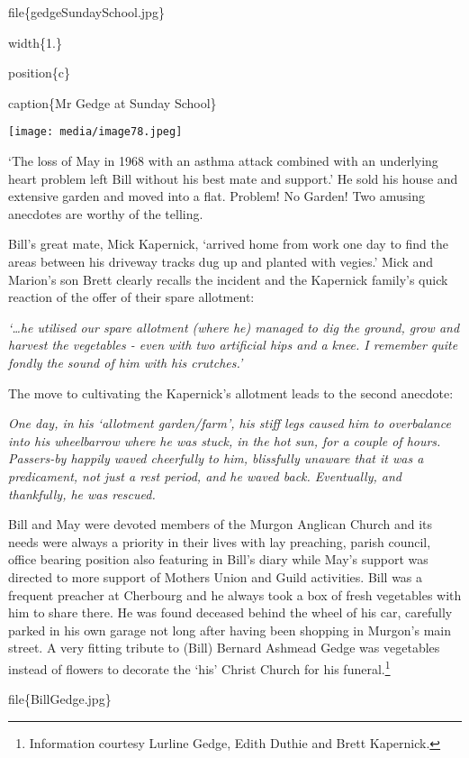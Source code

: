 file\{gedgeSundaySchool.jpg\}

width\{1.\}

position\{c\}

caption\{Mr Gedge at Sunday School\}

\texttt{[image: media/image78.jpeg]}

`The loss of May in 1968 with an asthma attack combined with an underlying heart problem left Bill without his best mate and support.' He sold his house and extensive garden and moved into a flat. Problem! No Garden! Two amusing anecdotes are worthy of the telling.

Bill's great mate, Mick Kapernick, `arrived home from work one day to find the areas between his driveway tracks dug up and planted with vegies.' Mick and Marion's son Brett clearly recalls the incident and the Kapernick family's quick reaction of the offer of their spare allotment:

\emph{`\ldots he utilised our spare allotment (where he) managed to dig the ground, grow and harvest the vegetables - even with two artificial hips and a knee. I remember quite fondly the sound of him with his crutches.'}

The move to cultivating the Kapernick's allotment leads to the second anecdote:

\emph{One day, in his `allotment garden/farm', his stiff legs caused him to overbalance into his wheelbarrow where he was stuck, in the hot sun, for a couple of hours. Passers-by happily waved cheerfully to him, blissfully unaware that it was a predicament, not just a rest period, and he waved back. Eventually, and thankfully, he was rescued.}

Bill and May were devoted members of the Murgon Anglican Church and its needs were always a priority in their lives with lay preaching, parish council, office bearing position also featuring in Bill's diary while May's support was directed to more support of Mothers Union and Guild activities. Bill was a frequent preacher at Cherbourg and he always took a box of fresh vegetables with him to share there. He was found deceased behind the wheel of his car, carefully parked in his own garage not long after having been shopping in Murgon's main street. A very fitting tribute to (Bill) Bernard Ashmead Gedge was vegetables instead of flowers to decorate the `his' Christ Church for his funeral.\footnote{Information courtesy Lurline Gedge, Edith Duthie and Brett Kapernick.}

file\{BillGedge.jpg\}


